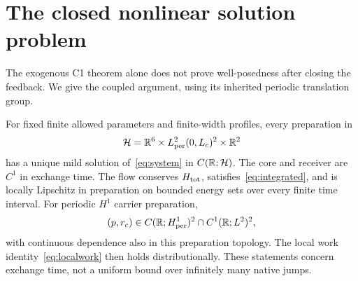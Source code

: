 \section{The closed nonlinear solution problem}\label{sec:wellposed}
The exogenous C1 theorem alone does not prove well-posedness after closing the feedback. We give the coupled argument, using its inherited periodic translation group.~\cite[carrier theorem]{paired}

\begin{theorem}\label{thm:global}
For fixed finite allowed parameters and finite-width profiles, every preparation in
\begin{equation}\label{eq:space}
 \mathcal H=\mathbb R^6\times L^2_{\rm per}(0,L_c)^2\times\mathbb R^2
\end{equation}
has a unique mild solution of~\eqref{eq:system} in $C(\mathbb R;\mathcal H)$. The core and receiver are $C^1$ in exchange time. The flow conserves $H_{\rm tot}$, satisfies~\eqref{eq:integrated}, and is locally Lipschitz in preparation on bounded energy sets over every finite time interval. For periodic $H^1$ carrier preparation,
\begin{equation}\label{eq:strong}
 (p,r_c)\in C(\mathbb R;H^1_{\rm per})^2\cap C^1(\mathbb R;L^2)^2,
\end{equation}
with continuous dependence also in this preparation topology. The local work identity~\eqref{eq:localwork} then holds distributionally. These statements concern exchange time, not a uniform bound over infinitely many native jumps.
\end{theorem}

